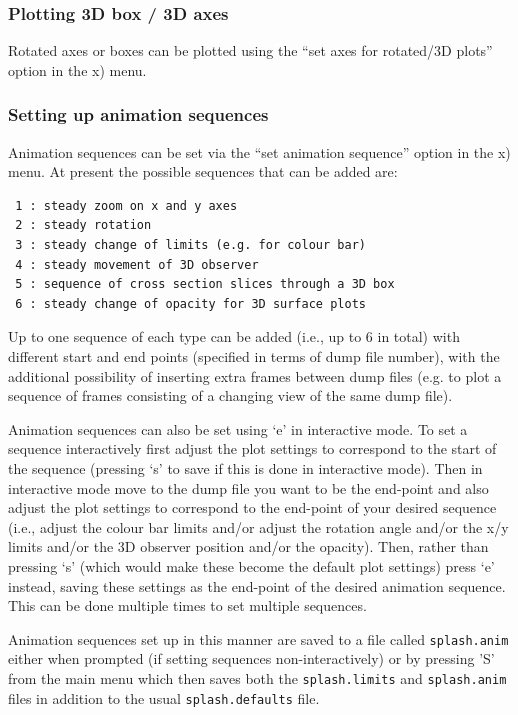\documentclass[a4paper,10pt]{article}
\begin{document}
\subsubsection{ Plotting 3D box / 3D axes}
Rotated axes or boxes can be plotted using the ``set axes for rotated/3D plots'' option in the x) menu.

\subsubsection{ Setting up animation sequences}
\label{sec:animseq}
 Animation sequences can be set via the ``set animation sequence'' option in the x) menu. At present the possible sequences that can be added are:
\begin{verbatim}
 1 : steady zoom on x and y axes                       
 2 : steady rotation                                   
 3 : steady change of limits (e.g. for colour bar)     
 4 : steady movement of 3D observer                    
 5 : sequence of cross section slices through a 3D box 
 6 : steady change of opacity for 3D surface plots
\end{verbatim}
 Up to one sequence of each type can be added (i.e., up to 6 in total) with different start and end points (specified in terms of dump file number), with the additional possibility of inserting extra frames between dump files (e.g. to plot a sequence of frames consisting of a changing view of the same dump file). 
 
 Animation sequences can also be set using `e' in interactive mode. To set a sequence interactively first adjust the plot settings to correspond to the start of the sequence (pressing `s' to save if this is done in interactive mode). Then in interactive mode move to the dump file you want to be the end-point and also adjust the plot settings to correspond to the end-point of your desired sequence (i.e., adjust the colour bar limits and/or adjust the rotation angle and/or the x/y limits and/or the 3D observer position and/or the opacity). Then, rather than pressing `s' (which would make these become the default plot settings) press `e' instead, saving these settings as the end-point of the desired animation sequence. This can be done multiple times to set multiple sequences.
 
  Animation sequences set up in this manner are saved to a file called \verb+splash.anim+ either when prompted (if setting sequences non-interactively) or by pressing 'S' from the main menu which then saves both the \verb+splash.limits+ and \verb+splash.anim+ files in addition to the usual \verb+splash.defaults+ file.
  
\end{document}
